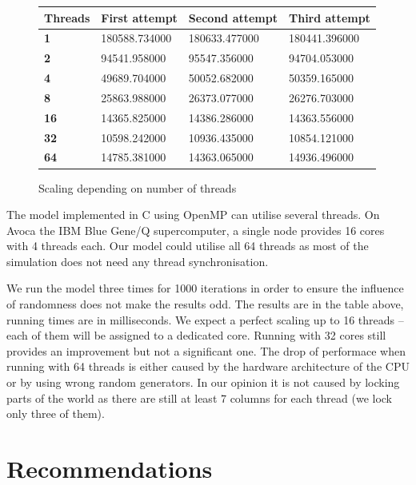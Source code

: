 \documentclass[a4paper]{article}
\begin{document}
\begin{figure}[ht]
    \centering
    \begin{tabu} {| X[0.8,c,p] || X[1,c,p] | X[1,c,p] | X[1,c,p] |}
        \rowfont{\bfseries}
        \hline
        Threads &
        First attempt &
        Second attempt&
        Third attempt \\
        \hline
        \hline
        \textbf{1} & 180588.734000 & 180633.477000 & 180441.396000 \\
        \hline
        \textbf{2} & 94541.958000 & 95547.356000 & 94704.053000 \\
        \hline
        \textbf{4} & 49689.704000 & 50052.682000 & 50359.165000 \\
        \hline
        \textbf{8} & 25863.988000 & 26373.077000 & 26276.703000 \\
        \hline
        \textbf{16} & 14365.825000 & 14386.286000 & 14363.556000 \\
        \hline
        \textbf{32} & 10598.242000 & 10936.435000 & 10854.121000 \\
        \hline
        \textbf{64} & 14785.381000 & 14363.065000 & 14936.496000 \\
        \hline
    \end{tabu}
    \caption{Scaling depending on number of threads}
\end{figure}


The model implemented in C using OpenMP can utilise several threads.
On Avoca the IBM Blue Gene/Q supercomputer, a single node provides 16 cores with 4 threads each.
Our model could utilise all 64 threads as most of the simulation does not need any thread synchronisation.

We run the model three times for 1000 iterations in order to ensure the influence of randomness does not make the results odd.
The results are in the table above, running times are in milliseconds.
We expect a perfect scaling up to 16 threads -- each of them will be assigned to a dedicated core.
Running with 32 cores still provides an improvement but not a significant one.
The drop of performace when running with 64 threads is either caused by the hardware architecture of the CPU or by using wrong random generators.
In our opinion it is not caused by locking parts of the world as there are still at least 7 columns for each thread (we lock only three of them).

\section{Recommendations}
\end{document}
